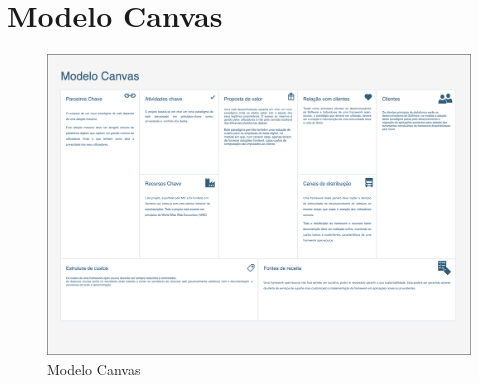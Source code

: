\section{Modelo Canvas}
\begin{figure}[h]
    \begin{center}
    \includegraphics[width=1 \textwidth, angle=-90]{figures/Canvas-Canvas.png}
    \caption{Modelo Canvas}
    \end{center}
\end{figure}
